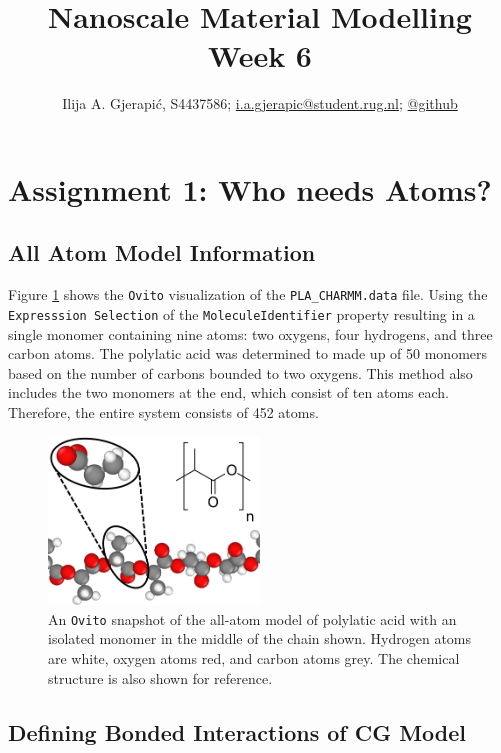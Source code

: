 \documentclass[10pt,a4paper]{labreport}
\title{Nanoscale Material Modelling
\\
\normalsize{Week 6}} %
\author{Ilija A. Gjerapić, S4437586; \href{mailto:i.a.gjerapic@student.rug.nl}{i.a.gjerapic@student.rug.nl}; \href{https://github.com/igjerapic/nmm-week6/}{@github} } %
\begin{document}
\maketitle
\tableofcontents


  

\thispagestyle{firststyle}
\newpage
\section{Assignment 1: Who needs Atoms?}
\subsection{All Atom Model Information}  
  Figure \ref{fig:ass1_PLA} shows the \texttt{Ovito} visualization of the \texttt{PLA\_CHARMM.data} file. Using the \texttt{Expresssion Selection} of the \texttt{MoleculeIdentifier} property resulting in a single monomer containing nine atoms: two oxygens, four hydrogens, and three carbon atoms. 
  The polylatic acid was determined to made up of 50 monomers based on the number of carbons bounded to two oxygens. This method also includes the two monomers at the end, which consist of ten atoms each. Therefore, the entire system consists of 452 atoms.   
  \begin{figure}[h]
    \centering 
    \includegraphics[width = 0.5\textwidth]{figs/ass1_PLA.png}
    \caption{An \texttt{Ovito} snapshot of the all-atom model of polylatic acid with an isolated monomer in the middle of the chain shown. Hydrogen atoms are white, oxygen atoms red, and carbon atoms grey. The chemical structure is also shown for reference.}
    \label{fig:ass1_PLA}
  \end{figure}

  \subsection{Defining Bonded Interactions of CG Model}
\end{document}
